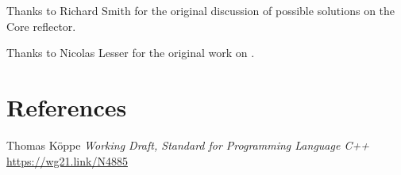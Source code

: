 \documentclass{wg21}
\begin{document}
Thanks to Richard Smith for the original discussion of possible solutions on the Core reflector.

Thanks to Nicolas Lesser for the original work on .

\section{References}

\renewcommand{\section}[2]{}%



\begin{thebibliography}{9}

Thomas Köppe
\emph{Working Draft, Standard for Programming Language C++}\newline
\url{https://wg21.link/N4885}


\end{thebibliography}
\end{document}
